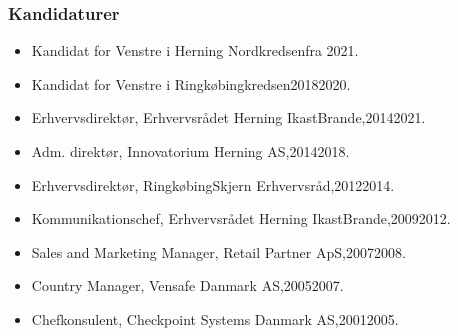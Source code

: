 \documentclass[11pt, a4paper]{awesome-cv}
\begin{document}
\begin{cvletter}
\subsubsection*{Kandidaturer}
\begin{itemize}
\item Kandidat for Venstre i Herning Nordkredsenfra 2021.
\item Kandidat for Venstre i Ringkøbingkredsen20182020.
\end{itemize}
\begin{itemize}
\item Erhvervsdirektør, Erhvervsrådet Herning  IkastBrande,20142021.
\item Adm. direktør, Innovatorium Herning AS,20142018.
\item Erhvervsdirektør, RingkøbingSkjern Erhvervsråd,20122014.
\item Kommunikationschef, Erhvervsrådet Herning  IkastBrande,20092012.
\item Sales and Marketing Manager, Retail Partner ApS,20072008.
\item Country Manager, Vensafe Danmark AS,20052007.
\item Chefkonsulent, Checkpoint Systems Danmark AS,20012005.
\end{itemize}
\end{cvletter}
\end{document}
